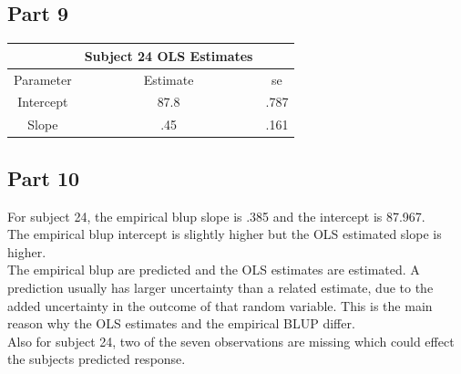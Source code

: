 \documentclass{article}
\begin{document}
\begin{flushleft}
\subsection*{Part 9}
\begin{tabular}{ccc}
\hline
&Subject 24 OLS Estimates\\	
\hline
Parameter & Estimate & se\\
\hline
Intercept & 87.8 & .787\\
Slope & .45 &.161\\
\hline
\end{tabular}
\subsection*{Part 10}
For subject 24, the empirical blup slope is .385 and the intercept is 87.967.\\
The empirical blup intercept is slightly higher but the OLS estimated slope is higher.\\
The empirical blup are predicted and the OLS estimates are estimated. A prediction usually has larger uncertainty than a related estimate, due to the added uncertainty in the outcome of that random variable. This is the main reason why the OLS estimates and the empirical BLUP differ.\\
Also for subject 24, two of the seven observations are missing which could effect the subjects predicted response.
\end{flushleft}
\end{document}
